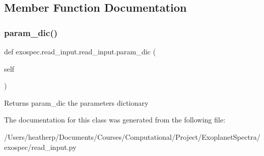 \subsection{Member Function Documentation}
\mbox{\label{classexospec_1_1read__input_1_1read__input_a3b21e8723a95f914bb6c329ba68c3d86}} 
\subsubsection{\texorpdfstring{param\+\_\+dic()}{param\_dic()}}
{\footnotesize\ttfamily def exospec.\+read\+\_\+input.\+read\+\_\+input.\+param\+\_\+dic (\begin{DoxyParamCaption}\item[{}]{self }\end{DoxyParamCaption})}

\begin{DoxyReturn}{Returns}
param\+\_\+dic the parameters dictionary 
\end{DoxyReturn}


The documentation for this class was generated from the following file\+:\begin{DoxyCompactItemize}
\item 
/\+Users/heatherp/\+Documents/\+Courses/\+Computational/\+Project/\+Exoplanet\+Spectra/exospec/read\+\_\+input.\+py\end{DoxyCompactItemize}
